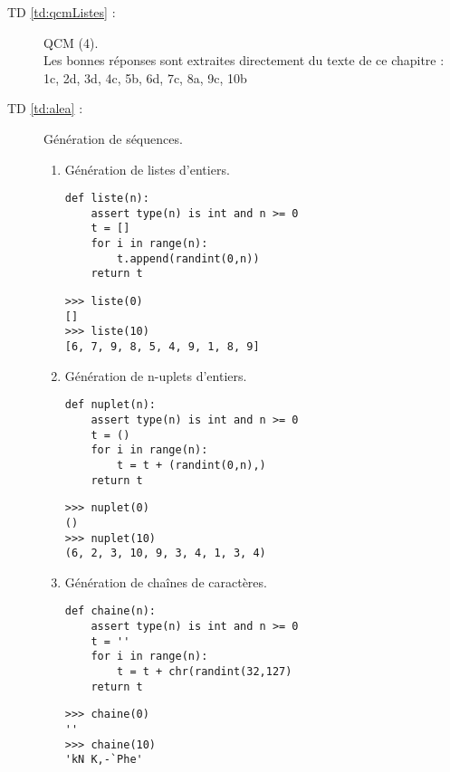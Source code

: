\begin{description}
\item[TD \ref{td:qcmListes} :] QCM (4).\\
	Les bonnes réponses sont extraites directement
	du texte de ce chapitre : \\
	1c, 2d, 3d, 4c, 5b, 6d, 7c, 8a, 9c, 10b

\item[TD \ref{td:alea} :] Génération de séquences.
\begin{enumerate}
\item Génération de listes d'entiers.

\begin{py}{6cm}
\begin{verbatim}
def liste(n):
    assert type(n) is int and n >= 0
    t = []
    for i in range(n):
        t.append(randint(0,n))
    return t
\end{verbatim}
\end{py}
\hfill
\begin{py}{6cm}
\begin{verbatim}
>>> liste(0)
[]
>>> liste(10)
[6, 7, 9, 8, 5, 4, 9, 1, 8, 9]
\end{verbatim}
\end{py}
\vspace*{2mm}

\item Génération de n-uplets d'entiers.

\begin{py}{6cm}
\begin{verbatim}
def nuplet(n):
    assert type(n) is int and n >= 0
    t = ()
    for i in range(n):
        t = t + (randint(0,n),)
    return t
\end{verbatim}
\end{py}
\hfill
\begin{py}{6cm}
\begin{verbatim}
>>> nuplet(0)
()
>>> nuplet(10)
(6, 2, 3, 10, 9, 3, 4, 1, 3, 4)
\end{verbatim}
\end{py}
\vspace*{2mm}

\item Génération de chaînes de caractères.

\begin{py}{6cm}
\begin{verbatim}
def chaine(n):
    assert type(n) is int and n >= 0
    t = ''
    for i in range(n):
        t = t + chr(randint(32,127)
    return t
\end{verbatim}
\end{py}
\hfill
\begin{py}{6cm}
\begin{verbatim}
>>> chaine(0)
''
>>> chaine(10)
'kN K,-`Phe'
\end{verbatim}
\end{py}
\vspace*{2mm}


\end{enumerate}
\end{description}

